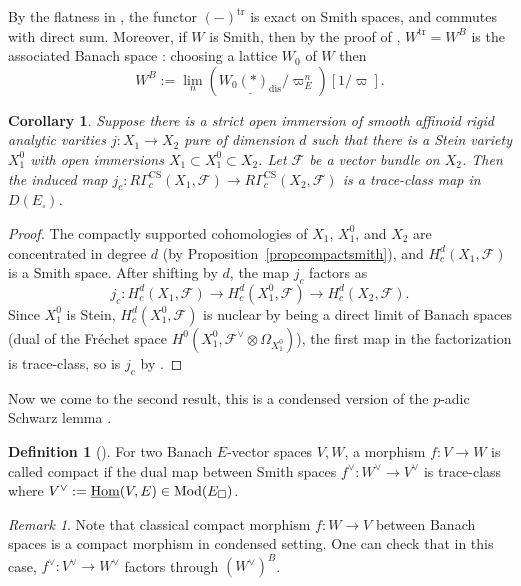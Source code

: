 \documentclass[a4paper,10pt]{amsart}
\theoremstyle{remark}
\newtheorem{remark}[theorem]{Remark}
\theoremstyle{definition}
\newtheorem{definition}[theorem]{Definition}
\theoremstyle{plain}
\newtheorem{corollary}[theorem]{Corollary}
\numberwithin{equation}{section}
\newcommand{\calF}{{\mathcal F}}
\newcommand{\Hom}{{\rm Hom}}
\newcommand{\Mod}{{\rm Mod}}
\newcommand{\trace}{\mathrm{tr}}
\newcommand{\dis}{\mathrm{dis}}
\newcommand{\CS}{\ensuremath{\mathrm{CS}}}
\begin{document}
By the flatness in \cite[Prop. A.27]{bosco2021drinfeldproetale}, the functor $(-)^{\trace}$ is exact on Smith spaces, and commutes with direct sum. Moreover, if $W$ is Smith, then by the proof of \cite[Lem. A.58]{bosco2021drinfeldproetale}, $W^{\trace}=W^B$ is the associated Banach space \cite[Def.~3.34(3)]{rodrigues2022solid}: choosing a lattice $W_0$ of $W$ then 
\begin{equation}\label{equationdefinitionassociatedBanach}
	W^B:=\lim_n (\underline{W_0(*)_{\dis}}/\varpi_E^n)[1/\varpi].
\end{equation}
\begin{corollary}\label{corollarytraceclass}
		Suppose there is a strict open immersion of smooth affinoid rigid analytic varities $j:X_1\to X_2$ pure of dimension $d$ such that there is a Stein variety $X^0_1$ with open immersions $X_1\subset X_1^0\subset X_2$. Let $\calF$ be a vector bundle on $X_2$. Then the induced map $j_c:R\Gamma_c^{\CS}(X_1,\calF)\to R\Gamma_c^{\CS}(X_2,\calF)$ is a trace-class map in $D(E_\square)$.
\end{corollary}

\begin{proof}
	 The compactly supported cohomologies of $X_1$, $X_1^0$, and $X_2$ are concentrated in degree $d$ (by Proposition~\ref{propcompactsmith}), and $H^d_c(X_1,\calF)$ is a Smith space. After shifting by $d$, the map $j_c$ factors as $$j_c:H^d_c(X_1,\calF)\to H^d_c(X_1^0,\calF)\to H^d_c(X_2,\calF).$$ 
	 Since $X_1^0$ is Stein, $H^d_c(X_1^0,\calF)$ is nuclear by \cite[Cor.~A.50, Thm.~A.43]{bosco2021drinfeldproetale} being a direct limit of Banach spaces (dual of the Fr\'echet space $H^0(X_1^0,\calF^{\vee}\otimes \Omega_{X_{1}^0})$), the first map in the factorization is trace-class, so is $j_c$ by \cite[Rem.~A.45]{bosco2021drinfeldproetale}.
\end{proof}

Now we come to the second result, this is a condensed version of the $p$-adic Schwarz lemma \cite[Satz~1.5]{kiehl1967endlichkeitssatz}.

\begin{definition}[{\cite[Def.~3.33]{rodrigues2022solid}}]\label{definitioncompactmorphism}
 	For two Banach $E$-vector spaces $V,W$, a morphism $f:V\to W$ is called compact if the dual map between Smith spaces $f^\vee: W^\vee\to V^\vee$ is trace-class where $V^\vee:=\underline{\Hom}(V,E)\in \Mod(E_\square)$.
 \end{definition}
 
 \begin{remark}
	Note that classical compact morphism $f:W\to V$ between Banach spaces is a compact morphism in condensed setting. One can check that in this case, $f^\vee: V^\vee\to W^\vee$ factors through $(W^\vee)^B$.  
\end{remark}
 
\end{document}
